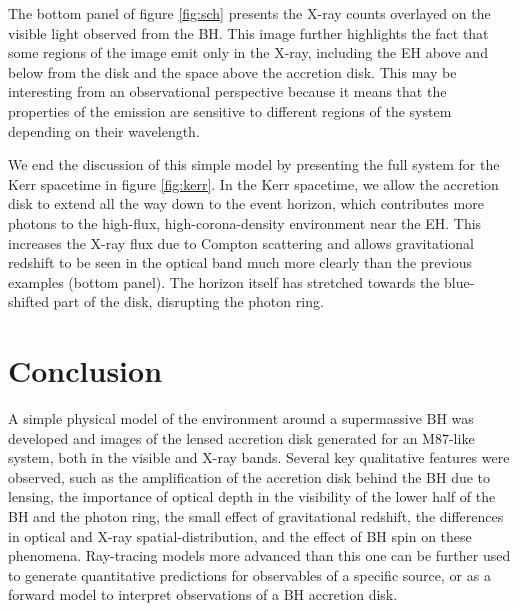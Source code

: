 \documentclass[twocolumn,twocolappendix]{aastex631}
\begin{document}
The bottom panel of figure \ref{fig:sch} presents the X-ray counts overlayed on the visible light observed from the BH. This image further highlights the fact that some regions of the image emit only in the X-ray, including the EH above and below from the disk and the space above the accretion disk. This may be interesting from an observational perspective because it means that the properties of the emission are sensitive to different regions of the system depending on their wavelength.
    
We end the discussion of this simple model by presenting the full system for the Kerr spacetime in figure \ref{fig:kerr}. In the Kerr spacetime, we allow the accretion disk to extend all the way down to the event horizon, which contributes more photons to the high-flux, high-corona-density environment near the EH. This increases the X-ray flux due to Compton scattering and allows gravitational redshift to be seen in the optical band much more clearly than the previous examples (bottom panel). The horizon itself has stretched towards the blue-shifted part of the disk, disrupting the photon ring.

\section{Conclusion}

A simple physical model of the environment around a supermassive BH was developed and images of the lensed accretion disk generated for an M87-like system, both in the visible and X-ray bands. Several key qualitative features were observed, such as the amplification of the accretion disk behind the BH due to lensing, the importance of optical depth in the visibility of the lower half of the BH and the photon ring, the small effect of gravitational redshift, the differences in optical and X-ray spatial-distribution, and the effect of BH spin on these phenomena. Ray-tracing models more advanced than this one can be further used to generate quantitative predictions for observables of a specific source, or as a forward model to interpret observations of a BH accretion disk.
\end{document}
